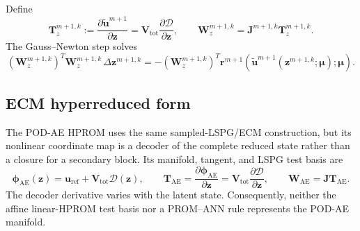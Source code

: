 \documentclass[11pt]{article}
\begin{document}
Define
\begin{equation}
\mathbf T_z^{m+1,k}:=\frac{\partial\tilde{\mathbf u}^{m+1}}{\partial\mathbf z}
=\mathbf V_{\mathrm{tot}}\frac{\partial\mathcal D}{\partial\mathbf z},
\qquad
\mathbf W_z^{m+1,k}=\mathbf J^{m+1,k}\mathbf T_z^{m+1,k}.
\end{equation}
The Gauss--Newton step solves
\begin{equation}
(\mathbf W_z^{m+1,k})^T\mathbf W_z^{m+1,k}\,\Delta\mathbf z^{m+1,k}
=
-(\mathbf W_z^{m+1,k})^T
\mathbf r^{m+1}(\tilde{\mathbf u}^{m+1}(\mathbf z^{m+1,k};\bm\mu);\bm\mu).
\end{equation}

\subsection{ECM hyperreduced form}
The POD-AE HPROM uses the same sampled-LSPG/ECM construction, but its
nonlinear coordinate map is a decoder of the complete reduced state rather
than a closure for a secondary block.  Its manifold, tangent, and LSPG test
basis are
\begin{equation}
\boldsymbol\phi_{\mathrm{AE}}(\mathbf z)
=
\mathbf u_{\mathrm{ref}}+\mathbf V_{\mathrm{tot}}\mathcal D(\mathbf z),
\qquad
\mathbf T_{\mathrm{AE}}
=
\frac{\partial\boldsymbol\phi_{\mathrm{AE}}}{\partial\mathbf z}
=
\mathbf V_{\mathrm{tot}}\frac{\partial\mathcal D}{\partial\mathbf z},
\qquad
\mathbf W_{\mathrm{AE}}=\mathbf J\mathbf T_{\mathrm{AE}}.
\label{eq:podae-ecm-tangent}
\end{equation}
The decoder derivative varies with the latent state. Consequently, neither
the affine linear-HPROM test basis nor a PROM--ANN rule represents the
POD-AE manifold.
\end{document}
